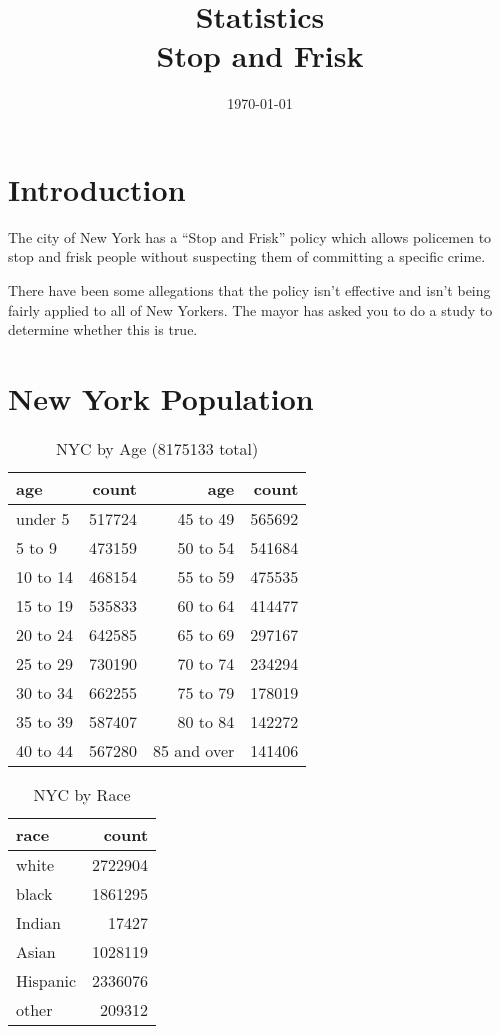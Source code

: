 \documentclass[letterpaper]{article}
\title{Statistics \\ Stop and Frisk}
\date{\today}
\author{}
\begin{document}
  \maketitle

  \section{Introduction}
  The city of New York has a ``Stop and Frisk'' policy which allows policemen to
  stop and frisk people without suspecting them of committing a specific crime.

  There have been some allegations that the policy isn't effective and isn't
  being fairly applied to all of New Yorkers.  The mayor has asked you to do a
  study to determine whether this is true.


  \section{New York Population}
  \begin{table}[H]
    \centering
    \begin{tabular}{lrrr}
      \toprule
      age      & count  & age         & count\\
      \midrule
      under 5  & 517724 & 45 to 49    & 565692 \\
      5 to 9   & 473159 & 50 to 54    & 541684 \\
      10 to 14 & 468154 & 55 to 59    & 475535 \\
      15 to 19 & 535833 & 60 to 64    & 414477 \\
      20 to 24 & 642585 & 65 to 69    & 297167 \\
      25 to 29 & 730190 & 70 to 74    & 234294 \\
      30 to 34 & 662255 & 75 to 79    & 178019 \\
      35 to 39 & 587407 & 80 to 84    & 142272 \\
      40 to 44 & 567280 & 85 and over & 141406 \\
      \bottomrule
    \end{tabular}
    \caption{NYC by Age (8175133 total)}
  \end{table}

  \begin{table}[H]
    \centering
    \begin{tabular}{lr}
      \toprule
      race     & count \\
      \midrule
      white    & 2722904 \\
      black    & 1861295 \\
      Indian   & 17427 \\
      Asian    & 1028119 \\
      Hispanic & 2336076 \\
      other    & 209312 \\
      \bottomrule
    \end{tabular}
    \caption{NYC by Race}
  \end{table}
\end{document}
